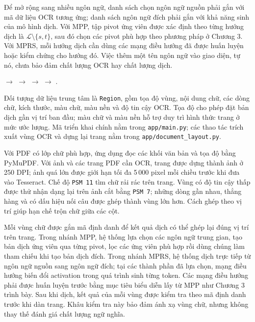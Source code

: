 Để mở rộng sang nhiều ngôn ngữ, danh sách chọn ngôn ngữ nguồn phải gắn với mã dữ liệu OCR tương ứng; danh sách ngôn ngữ đích phải gắn với khả năng sinh của mô hình dịch. Với MPP, tập pivot ứng viên được xác định theo từng hướng dịch là $\mathcal{L}\setminus\{s,t\}$, sau đó chọn các pivot phù hợp theo phương pháp ở Chương 3. Với MPRS, mỗi hướng dịch cần dùng các mạng điều hướng đã được huấn luyện hoặc kiểm chứng cho hướng đó. Việc thêm một tên ngôn ngữ vào giao diện, tự nó, chưa bảo đảm chất lượng OCR hay chất lượng dịch.

\begin{center}
$\longrightarrow$ 
$\longrightarrow$ 
$\longrightarrow$ 
$\longrightarrow$ .
\end{center}

Đối tượng dữ liệu trung tâm là \texttt{Region}, gồm tọa độ vùng, nội dung chữ, các dòng chữ, kích thước, màu chữ, màu nền và độ tin cậy OCR. Tọa độ cho phép đặt bản dịch gần vị trí ban đầu; màu chữ và màu nền hỗ trợ duy trì hình thức trang ở mức ước lượng. Mã triển khai chính nằm trong \texttt{app/main.py}; các thao tác trích xuất vùng OCR và dựng lại trang nằm trong \texttt{app/document\_layout.py}.

Với PDF có lớp chữ phù hợp, ứng dụng đọc các khối văn bản và tọa độ bằng PyMuPDF. Với ảnh và các trang PDF cần OCR, trang được dựng thành ảnh ở 250 DPI; ảnh quá lớn được giới hạn tối đa 5\,000 pixel mỗi chiều trước khi đưa vào Tesseract. Chế độ \texttt{PSM 11} tìm chữ rải rác trên trang. Vùng có độ tin cậy thấp được thử nhận dạng lại trên ảnh cắt bằng \texttt{PSM 7}; những dòng gần nhau, thẳng hàng và có dấu hiệu nối câu được ghép thành vùng lớn hơn. Cách ghép theo vị trí giúp hạn chế trộn chữ giữa các cột.

Mỗi vùng chữ được gắn mã định danh để kết quả dịch có thể ghép lại đúng vị trí trên trang. Trong nhánh MPP, hệ thống lựa chọn các ngôn ngữ trung gian, tạo bản dịch ứng viên qua từng pivot, lọc các ứng viên phù hợp rồi dùng chúng làm tham chiếu khi tạo bản dịch đích. Trong nhánh MPRS, hệ thống dịch trực tiếp từ ngôn ngữ nguồn sang ngôn ngữ đích; tại các thành phần đã lựa chọn, mạng điều hướng biến đổi activation trong quá trình sinh từng token. Các mạng điều hướng phải được huấn luyện trước bằng mục tiêu biểu diễn lấy từ MPP như Chương 3 trình bày. Sau khi dịch, kết quả của mỗi vùng được kiểm tra theo mã định danh trước khi dàn trang. Khâu kiểm tra này bảo đảm ánh xạ vùng chữ, nhưng không thay thế đánh giá chất lượng ngữ nghĩa.

